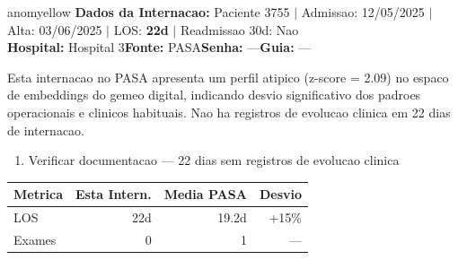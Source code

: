 \documentclass[a4paper,10pt]{article}
\begin{document}
\begin{anomalycard}[Internacao 159777 | PASA | MODERADO (z=2.09)]{anomyellow}
\textbf{Dados da Internacao:} Paciente 3755 $\mid$ Admissao: 12/05/2025 $\mid$ Alta: 03/06/2025 $\mid$ LOS: \textbf{22d} $\mid$ Readmissao 30d: Nao\\
\textbf{Hospital:} Hospital 3\quad\textbf{Fonte:} PASA\quad\textbf{Senha:} ---\quad\textbf{Guia:} ---\\
\vspace{2pt}\begin{tcolorbox}[colback=severityred!20,colframe=anomyellow,title={\textbf{Interpretacao de Negocio}},fonttitle=\bfseries\small,left=4pt,right=4pt,top=3pt,bottom=3pt]
{\small Esta internacao no PASA apresenta um perfil atipico (z-score = 2.09) no espaco de embeddings do gemeo digital, indicando desvio significativo dos padroes operacionais e clinicos habituais. Nao ha registros de evolucao clinica em 22 dias de internacao.}
\end{tcolorbox}
\begin{tcolorbox}[colback=severityyellow!30,colframe=anomorange,title={\textbf{Recomendacoes Especificas}},fonttitle=\bfseries\small,left=4pt,right=4pt,top=3pt,bottom=3pt]
\begin{enumerate}[nosep,leftmargin=16pt]
\item {\small Verificar documentacao --- 22 dias sem registros de evolucao clinica}
\end{enumerate}
\end{tcolorbox}
\begin{center}\begin{tabular}{l r r r}\toprule\textbf{Metrica} & \textbf{Esta Intern.} & \textbf{Media PASA} & \textbf{Desvio} \\\midrule
LOS & 22d & 19.2d & +15\% \\
Exames & 0 & 1 & --- \\
\bottomrule\end{tabular}\end{center}


\end{anomalycard}
\end{document}

